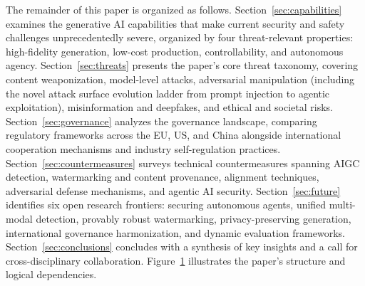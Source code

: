 
The remainder of this paper is organized as follows. Section~\ref{sec:capabilities} examines the generative AI capabilities that make current security and safety challenges unprecedentedly severe, organized by four threat-relevant properties: high-fidelity generation, low-cost production, controllability, and autonomous agency. Section~\ref{sec:threats} presents the paper's core threat taxonomy, covering content weaponization, model-level attacks, adversarial manipulation (including the novel attack surface evolution ladder from prompt injection to agentic exploitation), misinformation and deepfakes, and ethical and societal risks. Section~\ref{sec:governance} analyzes the governance landscape, comparing regulatory frameworks across the EU, US, and China alongside international cooperation mechanisms and industry self-regulation practices. Section~\ref{sec:countermeasures} surveys technical countermeasures spanning AIGC detection, watermarking and content provenance, alignment techniques, adversarial defense mechanisms, and agentic AI security. Section~\ref{sec:future} identifies six open research frontiers: securing autonomous agents, unified multi-modal detection, provably robust watermarking, privacy-preserving generation, international governance harmonization, and dynamic evaluation frameworks. Section~\ref{sec:conclusions} concludes with a synthesis of key insights and a call for cross-disciplinary collaboration. Figure~\ref{fig:structure} illustrates the paper's structure and logical dependencies.

\begin{figure}[htbp]
\centering
{}
\label{fig:structure}
\end{figure}
